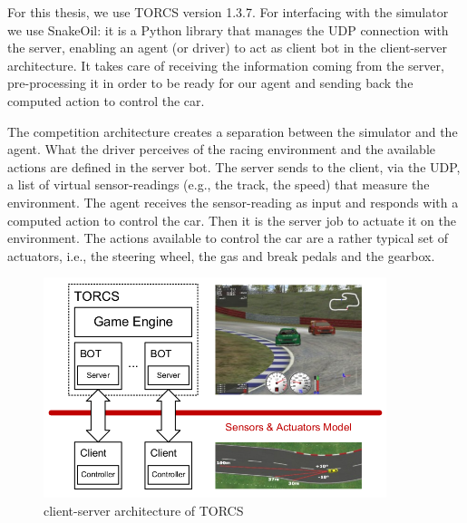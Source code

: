 For this thesis, we use TORCS version 1.3.7. For interfacing with the simulator we use SnakeOil: it is a Python library that manages the UDP connection with the server, enabling an agent (or driver) to act as client bot in the client-server architecture. It takes care of receiving the information coming from the server, pre-processing it in order to be ready for our agent and sending back the computed action to control the car.

The competition architecture creates a separation between the simulator and the agent. What the driver perceives of the racing environment and the available actions are defined in the server bot. The server sends to the client, via the UDP, a list of virtual sensor-readings (e.g., the track, the speed) that measure the environment. The agent receives the sensor-reading as input and responds with a computed action to control the car. Then it is the server job to actuate it on the environment. The actions available to control the car are a rather typical set of actuators, i.e., the steering wheel, the gas and break pedals and the gearbox.

\begin{figure}[t]
 \centering
  \captionsetup{width=10cm}
  \includegraphics[width=10cm]{./img/torcs_arc}
  \caption{client-server architecture of TORCS}
   \label{fig:torcs-arc}
\end{figure}




